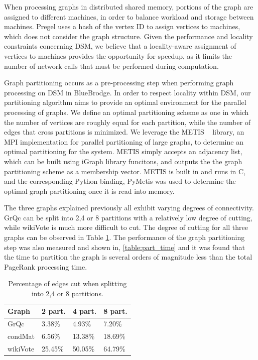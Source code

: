 When processing graphs in distributed shared memory, portions of the graph are
assigned to different machines, in order to balance workload and storage between
machines. Pregel uses a hash of the vertex ID to assign vertices to machines,
~\cite{Malewicz:2010:PSL:1807167.1807184} which does not consider the graph
structure. Given the performance and locality constraints concerning DSM,
we believe that a locality-aware assignment of vertices to machines provides the
opportunity for speedup, as it limits the number of network calls that must
be performed during computation.

Graph partitioning occurs as a pre-processing step when performing
graph processing on DSM in BlueBrodge. In order to respect locality within 
DSM, our partitioning algorithm aims to provide an optimal environment for the
parallel processing of graphs. We define an optimal partitioning scheme as one
in which the number of vertices are roughly equal for each partition, while the
number of edges that cross partitions is minimized. We leverage the METIS
~\cite{Lasalle:2013:metis} library, an MPI implementation for parallel
partitioning of large graphs, to determine an optimal partitioning for the
system. METIS simply accepts an adjacency list, which can be built using iGraph
library funcitons, and outputs the the graph partitioning scheme as a membership
vector. METIS is built in and runs in C, and the corresponding Python binding,
PyMetis \cite{pymetis} was used to determine the optimal graph partitioning once
it is read into memory. 

The three graphs explained previously all exhibit varying degrees of 
connectivity. GrQc can be split into 2,4 or 8 partitions with a relatively low
degree of cutting, while wikiVote is much more difficult to cut. The degree of
cutting for all three graphs can be observed in Table \ref{table:cutting}. 
The performance of the graph partitioning step was also measured and shown in,
\ref{table:part_time} and it was found that the time to partition the graph is
several orders of magnitude less than the total PageRank processing time.

\begin{table}[h]
\begin{tabularx}{\linewidth}{|X|X|X|X|}
\hline
Graph & 2 part. & 4 part. & 8 part. \\ \hline \hline
GrQc & 3.38\% & 4.93\% & 7.20\% \\ \hline
condMat & 6.56\% & 13.38\% & 18.69\% \\ \hline
wikiVote & 25.45\% & 50.05\% & 64.79\% \\ \hline
\end{tabularx}
\label{table:cutting}
\caption{Percentage of edges cut when splitting into 2,4 or 8 partitions.}
\end{table}

